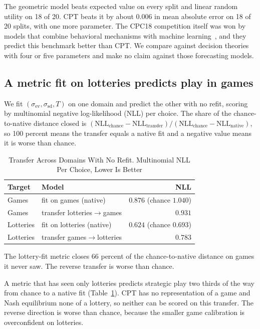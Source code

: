 \documentclass[journal]{IEEEtran}
\begin{document}
The geometric model beats expected value on every split and linear random utility on 18 of 20.
CPT beats it by about 0.006 in mean absolute error on 18 of 20 splits, with one more parameter.
The CPC18 competition itself was won by models that combine behavioral mechanisms with machine learning~\cite{plonsky2019}, and they predict this benchmark better than CPT.
We compare against decision theories with four or five parameters and make no claim against those forecasting models.

\subsection{A metric fit on lotteries predicts play in games}
We fit $(\sigma_{\mathrm{ev}},\sigma_{\mathrm{sd}},T)$ on one domain and predict the other with no refit, scoring by multinomial negative log-likelihood (NLL) per choice.
The share of the chance-to-native distance closed is $(\mathrm{NLL}_{\text{chance}}-\mathrm{NLL}_{\text{transfer}})/(\mathrm{NLL}_{\text{chance}}-\mathrm{NLL}_{\text{native}})$, so 100 percent means the transfer equals a native fit and a negative value means it is worse than chance.

\begin{table}[!t]
\renewcommand{\arraystretch}{1.15}
\caption{Transfer Across Domains With No Refit. Multinomial NLL Per Choice, Lower Is Better}
\label{tab:transfer}
\centering
\begin{tabular}{l l r}
\toprule
\textbf{Target} & \textbf{Model} & \textbf{NLL} \\
\midrule
Games      & fit on games (native)          & $0.876$ \quad (chance $1.040$) \\
Games      & transfer lotteries$\to$games   & $0.931$ \\
Lotteries  & fit on lotteries (native)      & $0.624$ \quad (chance $0.693$) \\
Lotteries  & transfer games$\to$lotteries   & $0.783$ \\
\bottomrule
\end{tabular}
\begin{flushleft}
\footnotesize{The lottery-fit metric closes 66 percent of the chance-to-native distance on games it never saw. The reverse transfer is worse than chance.}
\end{flushleft}
\end{table}

A metric that has seen only lotteries predicts strategic play two thirds of the way from chance to a native fit (Table~\ref{tab:transfer}).
CPT has no representation of a game and Nash equilibrium none of a lottery, so neither can be scored on this transfer.
The reverse direction is worse than chance, because the smaller game calibration is overconfident on lotteries.
\end{document}
